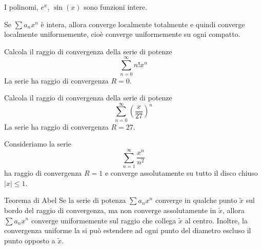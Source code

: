 \documentclass[a4paper]{article}
\begin{document}
\begin{radioactive}
\begin{snippetexample}{}
    I polinomi, \(e^x\), \(\sin(x)\) sono funzioni intere.
\end{snippetexample}
\end{radioactive}

\begin{radioactive}
Se \(\sum a_nx^n\) è intera, allora converge localmente totalmente e quindi
converge localmente uniformemente, cioè converge uniformemente su ogni compatto.
\end{radioactive}

\begin{radioactive}
\begin{snippetexample}{}
    Calcola il raggio di convergenza della serie di potenze
    \[
        \sum_{n=0}^\infty n!x^n
    \]
    La serie ha raggio di convergenza \(R=0\).
\end{snippetexample}
\end{radioactive}

\begin{radioactive}
\begin{snippetexample}{}
    Calcola il raggio di convergenza della serie di potenze
    \[
        \sum_{n=0}^\infty\left(\frac{x}{27}\right)^n
    \]
    La serie ha raggio di convergenza \(R=27\).
\end{snippetexample}
\end{radioactive}

\begin{radioactive}
\begin{snippetexample}{}
    Consideriamo la serie
    \[
        \sum_{n=1}^\infty\frac{x^n}{n^2}
    \]
    ha raggio di convergenza \(R=1\) e converge assolutamente su tutto il disco
    chiuso \(|x|\leq1\).
\end{snippetexample}
\end{radioactive}

\begin{radioactive}
\begin{snippettheorem}{Teorema di Abel}
    Se la serie di potenza \(\sum a_nx^n\) converge
    in qualche punto \(\tilde x\) sul bordo del raggio di convergenza,
    ma non converge assolutamente in \(\tilde x\),
    allora \(\sum a_nx^n\) converge uniformemente
    sul raggio che collega \(\tilde x\) al centro.
    Inoltre, la convergenza uniforme la si può estendere ad ogni punto
    del diametro escluso il punto opposto a \(\tilde x\).
\end{snippettheorem}
\end{radioactive}
\end{document}
